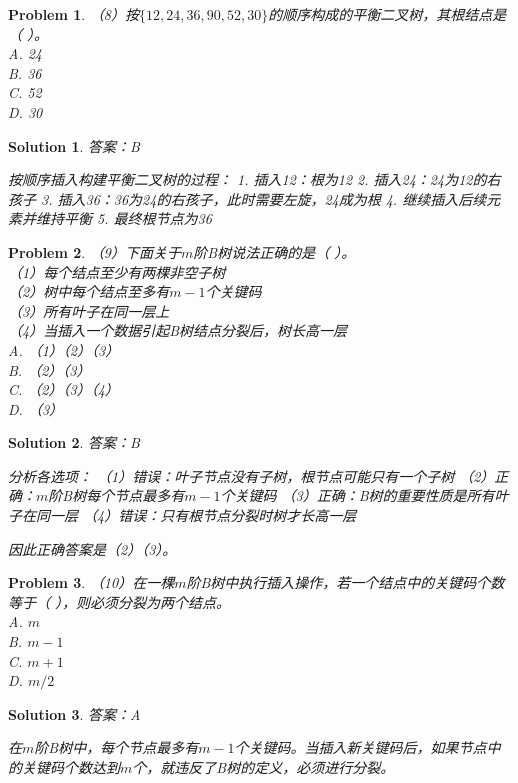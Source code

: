 \documentclass[12pt,a4paper]{amsart}
\newtheorem{problem}{Problem}[section]
\newtheorem{solution}{Solution}[section]
\begin{document}
\begin{problem}
（8）按$\{12,24,36,90,52,30\}$的顺序构成的平衡二叉树，其根结点是（ ）。\\
A. 24\\
B. 36\\
C. 52\\
D. 30
\end{problem}

\begin{solution}
答案：B

按顺序插入构建平衡二叉树的过程：
1. 插入12：根为12
2. 插入24：24为12的右孩子
3. 插入36：36为24的右孩子，此时需要左旋，24成为根
4. 继续插入后续元素并维持平衡
5. 最终根节点为36
\end{solution}

\begin{problem}
（9）下面关于$m$阶B树说法正确的是（ ）。\\
（1）每个结点至少有两棵非空子树\\
（2）树中每个结点至多有$m-1$个关键码\\
（3）所有叶子在同一层上\\
（4）当插入一个数据引起B树结点分裂后，树长高一层\\
A. （1）（2）（3）\\
B. （2）（3）\\
C. （2）（3）（4）\\
D. （3）
\end{problem}

\begin{solution}
答案：B

分析各选项：
（1）错误：叶子节点没有子树，根节点可能只有一个子树
（2）正确：$m$阶B树每个节点最多有$m-1$个关键码
（3）正确：B树的重要性质是所有叶子在同一层
（4）错误：只有根节点分裂时树才长高一层

因此正确答案是（2）（3）。
\end{solution}

\begin{problem}
（10）在一棵$m$阶B树中执行插入操作，若一个结点中的关键码个数等于（ ），则必须分裂为两个结点。\\
A. $m$\\
B. $m-1$\\
C. $m+1$\\
D. $m/2$
\end{problem}

\begin{solution}
答案：A

在$m$阶B树中，每个节点最多有$m-1$个关键码。当插入新关键码后，如果节点中的关键码个数达到$m$个，就违反了B树的定义，必须进行分裂。
\end{solution}
\end{document}
